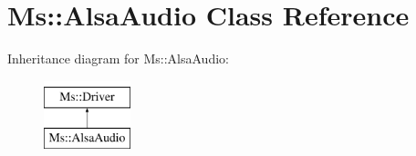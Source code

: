 \hypertarget{class_ms_1_1_alsa_audio}{}\section{Ms\+:\+:Alsa\+Audio Class Reference}
\label{class_ms_1_1_alsa_audio}
Inheritance diagram for Ms\+:\+:Alsa\+Audio\+:\begin{figure}[H]
\begin{center}
\leavevmode
\includegraphics[height=2.000000cm]{class_ms_1_1_alsa_audio}
\end{center}
\end{figure}
